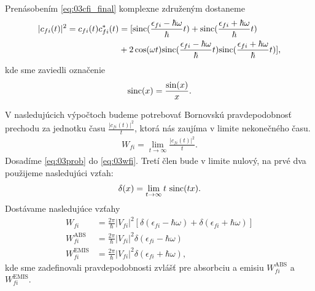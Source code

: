 Prenásobením \eqref{eq:03cfi_final} komplexne združeným dostaneme
\begin{align}
\label{eq:03prob}
|c_{fi}(t)|^2=c_{fi}(t)c_{fi}^*(t)&=[\mathrm{sinc}(\frac{\epsilon_{fi}-\hbar\omega}{\hbar}t)+\mathrm{sinc}(\frac{\epsilon_{fi}+\hbar\omega}{\hbar}t)\\
&+2\cos(\omega t)\mathrm{sinc}(\frac{\epsilon_{fi}-\hbar\omega}{\hbar}t)\mathrm{sinc}(\frac{\epsilon_{fi}+\hbar\omega}{\hbar}t)]\text{,} \notag
\end{align}
kde sme zaviedli označenie 
\begin{align}
\mathrm{sinc}(x)=\frac{\sin(x)}{x}\text{.}
\end{align}

V nasledujúcich výpočtoch budeme potrebovať Bornovskú pravdepodobnosť prechodu za jednotku času $\frac{|c_{fi}(t)|^2}{t}$, ktorá nás zaujíma v limite nekonečného času.
\begin{align}
\label{eq:03wfi}
W_{fi}=\lim_{t\to \infty} \frac{|c_{fi}(t)|^2}{t} \text{.}
\end{align}
Dosadíme \eqref{eq:03prob} do  \eqref{eq:03wfi}. Tretí člen bude v limite nulový, na prvé dva použijeme nasledujúci vzťah:
\begin{align}
\delta(x)=\lim_{t\to \infty}t\ \mathrm{sinc}(tx) \text{.}
\end{align}
Dostávame nasledujúce vzťahy
\begin{align}
W_{fi}&=\frac{2\pi}{\hbar}|V_{fi}|^2[\delta(\epsilon_{fi}-\hbar\omega)+\delta(\epsilon_{fi}+\hbar\omega)]\\
W_{fi}^{\mathrm{ABS}}&=\frac{2\pi}{\hbar}|V_{fi}|^2\delta(\epsilon_{fi}-\hbar\omega)\\
W_{fi}^{\mathrm{EMIS}}&=\frac{2\pi}{\hbar}|V_{fi}|^2\delta(\epsilon_{fi}+\hbar\omega)\text{,}
\end{align}
kde sme zadefinovali pravdepodobnosti zvlášť pre absorbciu a emisiu $W_{fi}^{\mathrm{ABS}}$ a $W_{fi}^{\mathrm{EMIS}}$.

